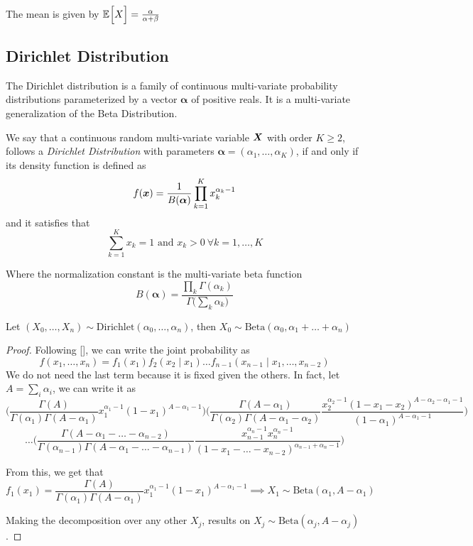 The mean is given by \(\mathbb{E}_{}\Big[X\Big] = \frac{\alpha}{\alpha + \beta}\)

\subsection{Dirichlet Distribution}

The Dirichlet distribution is a family of continuous multi-variate probability
distributions parameterized by a vector \(\bm{\alpha}\) of positive reals. It is
a multi-variate generalization of the Beta Distribution.

\begin{definition}
  We say that a continuous random multi-variate variable \(\bm{X}\) with order
  \(K \geq 2\), follows a \emph{Dirichlet
    Distribution} with parameters \(\bm{\alpha} = (\alpha_{1}, \dots, \alpha_{K})\), if and
  only if its density function is defined as
  \[
    f(\bm{x}) = \frac{1}{B(\bm{\alpha})}\prod_{k = 1}^{K}x_{k}^{\alpha_{k}-1}
  \]
  and it satisfies that
  \[
    \sum_{k=1}^{K} x_{k} = 1 \text{ and } x_{k} > 0 \ \forall k=1,\dots,K
  \]
\end{definition}

Where the normalization constant is the multi-variate beta function
\[
  B(\bm{\alpha}) = \frac{\prod_{k} \Gamma (\alpha_{k})}{\Gamma \big( \sum_{k}\alpha_{k} \big)}
\]


\begin{proposition}\label{prop:dirichlet_marginal}
  Let
  \((X_{0},\dots, X_{n}) \sim \text{Dirichlet}(\alpha_{0}, \dots, \alpha_{n})\),
  then \(X_{0} \sim \text{Beta}(\alpha_{0}, \alpha_{1}+\dots+\alpha_{n})\)
\end{proposition}
\begin{proof}
  Following [\cite{farrow}], we can write the joint probability as
  \[
    f(x_{1},\dots,x_{n}) = f_{1}(x_{1})f_{2}(x_{2}\mid x_{1})\dots f_{n-1}(x_{n-1}\mid x_{1},\dots, x_{n-2})
  \]
  We do not need the last term because it is fixed given the others. In fact, let \(A = \sum_{i} \alpha_{i}\), we can write it as
  \[
   \Bigg( \frac{\Gamma(A)}{\Gamma(\alpha_{1}) \Gamma(A - \alpha_{1})}x_{1}^{\alpha_{1}-1}(1 - x_{1})^{A - \alpha_{1} -1}\Bigg)\Bigg( \frac{\Gamma(A - \alpha_{1})}{\Gamma(\alpha_{2}) \Gamma(A - \alpha_{1} - \alpha_{2})}\frac{ x_{2}^{\alpha_{2}-1}(1-x_{1}- x_{2})^{A - \alpha_{2}- \alpha_{1} - 1} }{(1-\alpha_{1})^{A - \alpha_{1} - 1} }\Bigg )
 \]
 \[
   \dots \Big(\frac{\Gamma(A - \alpha_{1} - \dots - \alpha_{n-2})}{\Gamma(\alpha_{n-1}) \Gamma(A - \alpha_{1}- \dots - \alpha_{n-1})}  \frac{ x_{n-1}^{\alpha_{n}-1} x_{n}^{\alpha_{n}-1}}{(1-x_{1}- \dots - x_{n-2})^{\alpha_{n-1}+\alpha_{n}-1}}\Big)
 \]

 From this, we get that
 \[
   f_{1}(x_{1}) =  \frac{\Gamma(A)}{\Gamma(\alpha_{1}) \Gamma(A - \alpha_{1})}x_{1}^{\alpha_{1}-1}(1 - x_{1})^{A - \alpha_{1} -1} \implies X_{1} \sim \text{Beta}(\alpha_{1}, A- \alpha_{1})
 \]

 Making the decomposition over any other \(X_{j}\), results on
 \(X_{j} \sim \text{Beta}(\alpha_{j}, A - \alpha_{j})\).
\end{proof}

